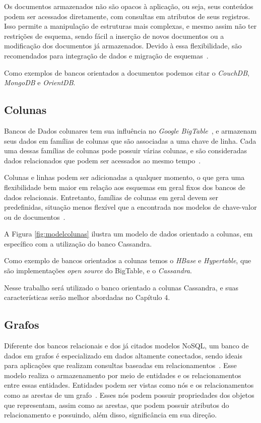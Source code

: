 
Os documentos armazenados não são opacos à aplicação, ou seja, seus conteúdos podem ser acessados diretamente, com consultas em atributos de seus registros. Isso permite a manipulação de estruturas mais complexas, e mesmo assim não ter restrições de esquema, sendo fácil a inserção de novos documentos ou a modificação dos documentos já armazenados. Devido à essa flexibilidade, são recomendados para integração de dados e migração de esquemas~\cite{nosqleval}. 

Como exemplos de bancos orientados a documentos podemos citar o \emph{CouchDB}, \emph{MongoDB} e \emph{OrientDB}.

\subsection*{Colunas}
Bancos de Dados colunares tem sua influência no \emph{Google BigTable}~\cite{bigtable}, e armazenam seus dados em famílias de colunas que são associadas a uma chave de linha. Cada uma dessas famílias de colunas pode possuir várias colunas, e são consideradas dados relacionados que podem ser acessados ao mesmo tempo~\cite{pramod}. 

Colunas e linhas podem ser adicionadas a qualquer momento, o que gera uma flexibilidade bem maior em relação aos esquemas em geral fixos dos bancos de dados relacionais.  Entretanto, famílias de colunas em geral devem ser predefinidas, situação menos flexível que a encontrada nos modelos de chave-valor ou de documentos~\cite{nosqleval}.  

A Figura \ref{fig:modelcolunas} ilustra um modelo de dados orientado a colunas, em específico com a utilização do banco Cassandra.

Como exemplo de bancos orientados a colunas temos o \emph{HBase} e \emph{Hypertable}, que são implementações \emph{open source} do BigTable, e o \emph{Cassandra}.

Nesse trabalho será utilizado o banco orientado a colunas Cassandra, e suas características serão melhor abordadas no Capítulo 4.


\subsection*{Grafos}
Diferente dos bancos relacionais e dos já citados modelos NoSQL, um banco de dados em grafos é especializado em dados altamente conectados, sendo ideais para aplicações que realizam consultas baseadas em relacionamentos~\cite{nosqleval}.
Esse modelo realiza o armazenamento por meio de entidades e os relacionamentos entre essas entidades. Entidades podem ser vistas como nós e os relacionamentos como as arestas de um grafo~\cite{pramod}. Esses nós podem possuir propriedades dos objetos que representam, assim como as arestas, que podem possuir atributos do relacionamento e possuindo, além disso, significância em sua direção.

